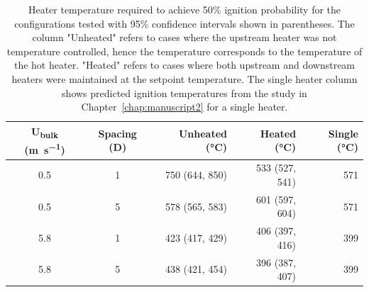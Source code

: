         \begin{table}[hpbt]
            \normalsize
            \caption{Heater temperature required to achieve 50\% ignition probability for the configurations tested with 95\% confidence intervals shown in parentheses. The column "Unheated" refers to cases where the upstream heater was not temperature controlled, hence the  temperature corresponds to the temperature of the hot heater. "Heated" refers to cases where both upstream and downstream heaters were maintained at the setpoint temperature. The single heater column shows predicted ignition temperatures from the study in Chapter~\ref{chap:manuscript2} for a single heater.}
            \centering
            \begin{tabular}{ccrrr}
                \rowcolor{gray!50}
               U\textsubscript{bulk} (\si{\meter\per\second}) & Spacing (D) & Unheated (\si{\celsius})& Heated (\si{\celsius}) & Single (\si{\celsius})\\
                \hline
                0.5  & 1 & 750 (644, 850) & 533 (527, 541) & 571\\
                0.5  & 5 & 578 (565, 583) & 601 (597, 604) & 571\\
                5.8  & 1 & 423 (417, 429) & 406 (397, 416) & 399\\
                5.8  & 5 & 438 (421, 454) & 396 (387, 407) & 399
            \end{tabular}
            \label{tab:multiFiftyTemp}
        \end{table}
        
